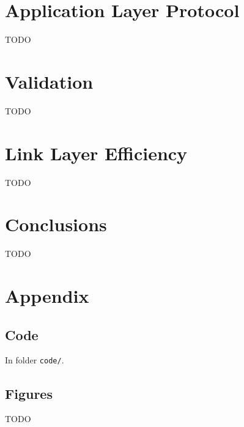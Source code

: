 \documentclass[11pt,a4paper,twocolumn]{article}
\begin{document}
\section{Application Layer Protocol}

TODO

\section{Validation}

TODO

\section{Link Layer Efficiency}

TODO

\section{Conclusions}

TODO

\pagebreak
\appendix
\section{Appendix}

\subsection{Code}

\noindent In folder \lstinline{code/}.

\subsection{Figures}

TODO
\end{document}
